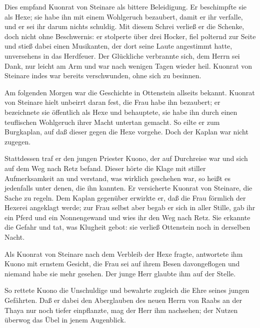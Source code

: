 Dies empfand \gls{Kuonrat von Steinare} als bittere Beleidigung. Er beschimpfte sie als Hexe; sie habe ihn mit einem Wohlgeruch bezaubert, damit er ihr verfalle, und er sei ihr darum nichts schuldig. Mit diesem Schrei verließ er die \gls{Schenke}, doch nicht ohne Beschwernis: er stolperte über drei Hocker, fiel polternd zur Seite und stieß dabei einen Musikanten, der dort seine Laute angestimmt hatte, unversehens in das Herdfeuer. Der Glückliche verbrannte sich, dem Herrn sei Dank, nur leicht am Arm und war nach wenigen Tagen wieder heil. \gls{Kuonrat von Steinare} indes war bereits verschwunden, ohne sich zu besinnen.

Am folgenden Morgen war die Geschichte in Ottenstein allseits bekannt. \gls{Kuonrat von Steinare} hielt unbeirrt daran fest, die Frau habe ihn bezaubert; er bezeichnete sie öffentlich als Hexe und behauptete, sie habe ihn durch einen teuflischen Wohlgeruch ihrer Macht untertan gemacht. So eilte er zum Burgkaplan, auf daß dieser gegen die Hexe vorgehe. Doch der Kaplan war nicht zugegen.

Stattdessen traf er den jungen Priester \gls{Kuono}, der auf Durchreise war und sich auf dem Weg nach \gls{Retz} befand. Dieser hörte die Klage mit stiller Aufmerksamkeit an und verstand, was wirklich geschehen war, so heißt es jedenfalls unter denen, die ihn kannten. Er versicherte \gls{Kuonrat von Steinare}, die Sache zu regeln. Dem Kaplan gegenüber erwirkte er, daß die Frau förmlich der Hexerei angeklagt werde; zur Frau selbst aber begab er sich in aller Stille, gab ihr ein Pferd und ein Nonnengewand und wies ihr den Weg nach \gls{Retz}. Sie erkannte die Gefahr und tat, was Klugheit gebot: sie verließ Ottenstein noch in derselben Nacht.

Als \gls{Kuonrat von Steinare} nach dem Verbleib der Hexe fragte, antwortete ihm \gls{Kuono} mit ernstem Gesicht, die Frau sei auf ihrem Besen davongeflogen und niemand habe sie mehr gesehen. Der junge Herr glaubte ihm auf der Stelle.

So rettete \gls{Kuono} die Unschuldige und bewahrte zugleich die Ehre seines jungen Gefährten. Daß er dabei den Aberglauben des neuen Herrn von \gls{Raabs an der Thaya} nur noch tiefer einpflanzte, mag der Herr ihm nachsehen; der Nutzen überwog das Übel in jenem Augenblick.
